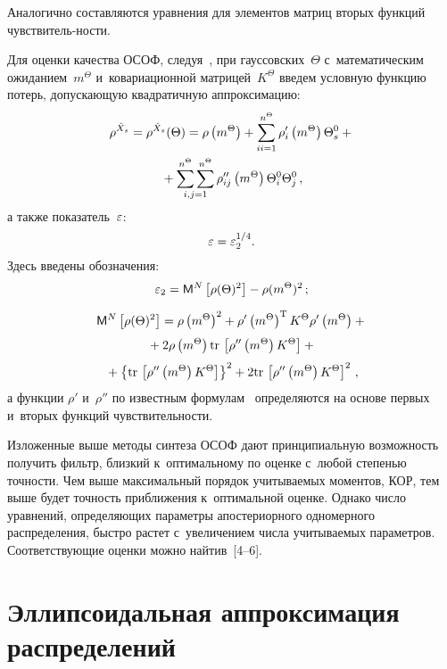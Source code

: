\begin{multicols}{2}
Аналогично 
составляются уравнения для элементов матриц вторых функций чувствитель-\linebreak ности.

Для оценки качества ОСОФ, следуя~\cite{1-s1, 2-s1}, при гауссовских~$\Theta$ 
с~математическим ожиданием~$m^\Theta$ и~ковариационной мат\-ри\-цей~$K^\Theta$  
введем условную функцию потерь, допускающую квадратичную аппроксимацию:
    \begin{multline*}
    \rho^{\hat X_s}=\rho^{\hat X_s}(\Theta) =\rho \left(m^\Theta\right) +
    \sss_{ii=1}^{n^\Theta} \rho_i' \left(m^\Theta\right)\Theta_s^0+ {}\\
    {}+
    \sm2\limits_{i,j=1} \rho_{ij}'' \left(m^\Theta\right)\Theta_i^0 
    \Theta_j^0\,,
    \end{multline*}
а также показатель~$\varepsilon$:
\begin{equation*}
\varepsilon =\varepsilon_2^{1/4}.
\end{equation*}
Здесь введены обозначения:
    $$\varepsilon_2 = {\sf M}^N \left[ \rho (\Theta)^2\right] -\rho (m^\Theta)^2\,;$$
    
    \vspace*{-9pt}
    
    \noindent
    \begin{multline*}
{\sf M}^N \left[ \rho(\Theta)^2\right] = \rho \left(m^\Theta\right)^2 +
\rho' \left(m^\Theta\right)^{\mathrm{T}} K^\Theta \rho'\left(m^\Theta\right)+ {}\\[3pt]
{}+
2\rho \left(m^\Theta\right) \mathrm{tr}\, \left[ \rho''\left(m^\Theta\right)K^\Theta\right]+{}\\[3pt]
{}+\left\{ \mathrm{tr}\, \left[ \rho'' \left(m^\Theta\right) K^\Theta\right] \right\}^2+2 
\mathrm{tr}\, \left[ \rho''\left(m^\Theta\right) K^\Theta\right]^2\,,
\end{multline*}
а функции $\rho'$ и~$\rho''$ по известным формулам~\cite{9-s1, 10-s1} 
определяются на основе первых и~вторых функций чувствительности.

Изложенные выше методы синтеза ОСОФ дают
принципиальную возможность получить фильтр, близкий к~оптимальному по
оценке с~любой сте\-пенью точности.
Чем выше максимальный порядок учитываемых моментов, КОР, тем выше будет точность
приближения к~оптимальной оценке. Однако число уравнений,
определяющих параметры апостериорного одномерного распределения, быст\-ро растет
с~увеличением числа учитываемых па\-ра\-мет\-ров.
Соответствующие оценки можно найти\linebreak в~[4--6].

\section{Эллипсоидальная аппроксимация распределений}


\end{multicols}
